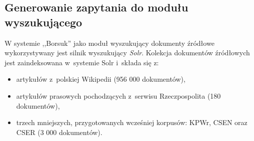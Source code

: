 \documentclass[a4paper, twoside, 12pt]{report}
\begin{document}
        \subsection{Generowanie zapytania do modułu wyszukującego}
            W systemie ,,Borsuk'' jako moduł wyszukujący dokumenty źródłowe wykorzystywany jest silnik wyszukujący \emph{Solr}\cite{SOLR}.
            Kolekcja dokumentów źródłowych jest zaindeksowana w~systemie Solr i~składa się z\cite{BORSUK}:
            \begin{itemize}
                \item artykułów z~polskiej Wikipedii (956 000 dokumentów),
                \item artykułów prasowych pochodzących z~serwisu Rzeczpospolita (180 dokumentów),
                \item trzech mniejszych, przygotowanych wcześniej korpusów: KPWr, CSEN oraz CSER (3 000 dokumentów).
            \end{itemize}
\end{document}
